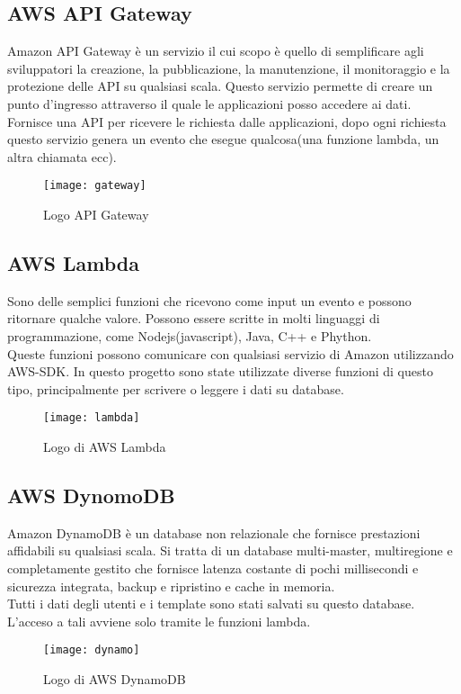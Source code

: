 \subsection{AWS API Gateway} Amazon API Gateway è un servizio il cui scopo è quello di semplificare agli sviluppatori
la creazione, la pubblicazione, la manutenzione, il monitoraggio e la protezione
delle API su qualsiasi scala.
Questo servizio permette di creare un punto d'ingresso attraverso il quale le applicazioni posso accedere ai dati. Fornisce una API per ricevere le richiesta dalle applicazioni, dopo ogni richiesta questo servizio genera un evento che esegue qualcosa(una funzione lambda, un altra chiamata ecc).
\begin{figure}[!h] 
	\centering 
	\texttt{[image: gateway]}
	\caption{Logo API Gateway}
\end{figure}

\subsection{AWS Lambda} 

Sono delle semplici funzioni che ricevono come input un evento e possono ritornare qualche valore. Possono essere scritte in molti linguaggi di programmazione, come Nodejs(javascript), Java, C++ e Phython. 
\\

Queste funzioni possono comunicare con qualsiasi servizio di Amazon utilizzando AWS-SDK. In questo progetto sono state utilizzate diverse funzioni di questo tipo, principalmente per scrivere o leggere i dati su database.
\begin{figure}[!h] 
	\centering 
	\texttt{[image: lambda]}
	\caption{Logo di AWS Lambda}
\end{figure}  

\subsection{AWS DynomoDB} 
Amazon DynamoDB è un database non relazionale che fornisce prestazioni affidabili su qualsiasi scala. Si tratta di un database multi-master, multiregione e completamente gestito che fornisce latenza costante di pochi millisecondi e sicurezza integrata, backup e ripristino e cache in memoria.
\\

 Tutti i dati degli utenti e i template sono stati salvati su questo database. L'acceso a tali avviene solo tramite le funzioni lambda.   
\begin{figure}[!h] 
	\centering 
	\texttt{[image: dynamo]}
	\caption{Logo di AWS DynamoDB}
\end{figure}

